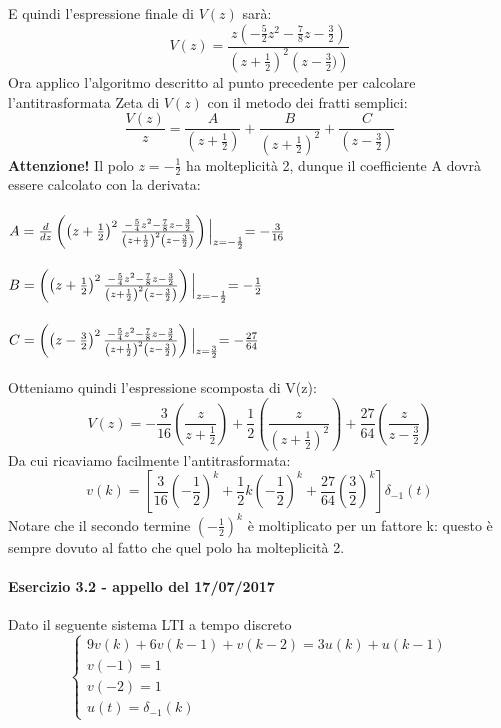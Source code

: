 \documentclass[12pt,a4paper]{article}
\begin{document}
\begin{enumerate}
	E quindi l'espressione finale di $V(z)$ sar\`a:
	\[
		V(z) = \frac{z\left(-\frac{5}{2}z^2-\frac{7}{8}z-\frac{3}{2}\right)}{\left(z+\frac{1}{2}\right)^2\left(z-\frac{3}{2})\right)}
	\]
	Ora applico l'algoritmo descritto al punto precedente per calcolare l'antitrasformata Zeta di $V(z)$ con il metodo dei fratti semplici:
	\[
		\frac{V(z)}{z} = \frac{A}{\left(z+\frac{1}{2}\right)} + \frac{B}{\left(z+\frac{1}{2}\right)^2} + \frac{C}{\left(z-\frac{3}{2}\right)}
	\]
	\textbf{Attenzione!} Il polo $z = -\frac{1}{2}$ ha molteplicit\`a 2, dunque il coefficiente A dovr\`a essere calcolato con la derivata:\\ \\
	$A=\frac{d}{dz}\left( \left(z+\frac{1}{2}\right)^2\frac{-\frac{5}{4}z^2-\frac{7}{8}z-\frac{3}{2}}{\left(z+\frac{1}{2}\right)^2\left(z-\frac{3}{2}\right)}\right)\Bigl\vert_{z=-\frac{1}{2}} = -\frac{3}{16}$	\\ \\
	$B=\left(\left(z+\frac{1}{2}\right)^2\frac{-\frac{5}{4}z^2-\frac{7}{8}z-\frac{3}{2}}{\left(z+\frac{1}{2}\right)^2\left(z-\frac{3}{2}\right)}\right)\Bigl\vert_{z=-\frac{1}{2}} = -\frac{1}{2}$ \\ \\
	$C=\left(\left(z-\frac{3}{2}\right)^2\frac{-\frac{5}{4}z^2-\frac{7}{8}z-\frac{3}{2}}{\left(z+\frac{1}{2}\right)^2\left(z-\frac{3}{2}\right)}\right)\Bigl\vert_{z=\frac{3}{2}} = -\frac{27}{64}$ \\ \\
	Otteniamo quindi l'espressione scomposta di V(z):
	\[
		V(z) = -\frac{3}{16}
		\left(\frac{z}{z+\frac{1}{2}}\right)
		+ \frac{1}{2}\left(\frac{z}{(z+\frac{1}{2})^2}\right)
		+ \frac{27}{64}\left(\frac{z}{z-\frac{3}{2}}\right)
	\]
	Da cui ricaviamo facilmente l'antitrasformata:
	\[
		v(k) = \left[\frac{3}{16}\left(-\frac{1}{2}\right)^k + \frac{1}{2}k\left(-\frac{1}{2}\right)^k + \frac{27}{64}\left(\frac{3}{2}\right)^k\right]\delta_{-1}(t)
	\]
	Notare che il secondo termine $\left(-\frac{1}{2}\right)^k$ \`e moltiplicato per un fattore k: questo \`e sempre dovuto al fatto che quel polo ha molteplicit\`a 2.
	\end{enumerate}
	\newpage
	\paragraph*{Esercizio 3.2 - appello del 17/07/2017} Dato il seguente sistema LTI a tempo discreto
	\[
		\begin{cases}
			9v(k) + 6v(k-1) + v(k-2) = 3u(k) + u(k-1) \\
			v(-1) = 1 \\
			v(-2) = 1 \\
			u(t) = \delta_{-1}(k)
		\end{cases}
	\]
\end{document}
